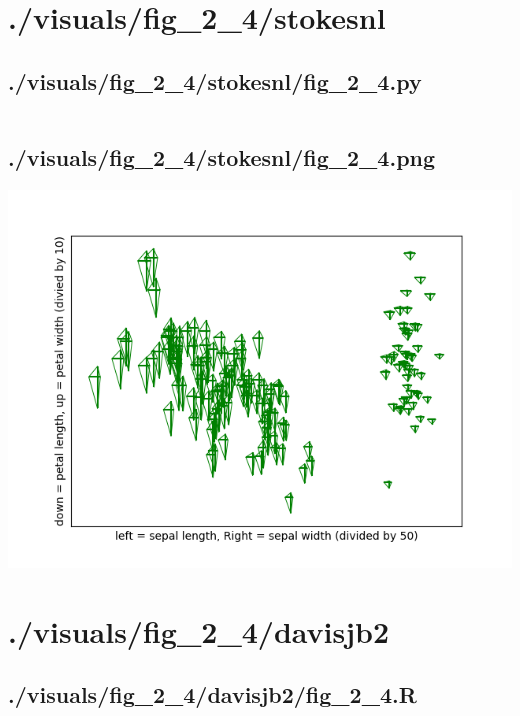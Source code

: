 \documentclass{report}
\begin{document}
    \section{./visuals/fig\_2\_4/stokesnl}
    \subsection{./visuals/fig\_2\_4/stokesnl/fig\_2\_4.py}
    \inputminted[breaklines=true]{python}{.././visuals/fig_2_4/stokesnl/fig_2_4.py}
    \subsection{./visuals/fig\_2\_4/stokesnl/fig\_2\_4.png}
    \includegraphics[width=\textwidth]{.././visuals/fig_2_4/stokesnl/fig_2_4.png}
    \pagebreak
    \section{./visuals/fig\_2\_4/davisjb2}
    \subsection{./visuals/fig\_2\_4/davisjb2/fig\_2\_4.R}
    \inputminted[breaklines=true]{r}{.././visuals/fig_2_4/davisjb2/fig_2_4.R}
\end{document}
